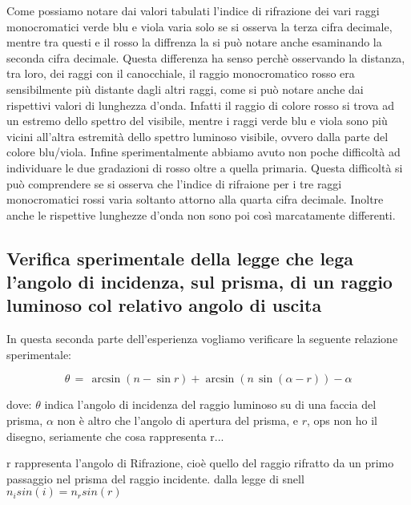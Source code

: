 Come possiamo notare dai valori tabulati l'indice di rifrazione dei vari raggi monocromatici verde blu e viola varia solo se si osserva la terza cifra decimale, mentre tra questi e il rosso la diffrenza la si può notare anche esaminando la seconda cifra decimale. Questa differenza ha senso perchè osservando la distanza, tra loro, dei raggi con il canocchiale, il raggio monocromatico rosso era sensibilmente più distante dagli altri raggi, come si può notare anche dai rispettivi valori di lunghezza d'onda. Infatti il raggio di colore rosso si trova ad un estremo dello spettro del visibile, mentre i raggi verde blu e viola sono più vicini all'altra estremità dello spettro luminoso visibile, ovvero dalla parte del colore blu/viola. Infine sperimentalmente abbiamo avuto non poche difficoltà ad individuare le due gradazioni di rosso oltre a quella primaria. Questa difficoltà si può comprendere se si osserva che l'indice di rifraione per i tre raggi monocromatici rossi varia soltanto attorno alla quarta cifra decimale. Inoltre anche le rispettive lunghezze d'onda non sono poi così marcatamente differenti.

\subsection{Verifica sperimentale della legge che lega l'angolo di incidenza, sul prisma, di un raggio luminoso col relativo angolo di uscita}

In questa seconda parte dell'esperienza vogliamo verificare la seguente relazione sperimentale:

\begin{equation}
	\theta \,=\, \arcsin{(n - \sin{r})} + \arcsin{(n \, \sin{(\alpha - r)})} - \alpha
	\label{eq.brutta}
\end{equation}

dove: $\theta$ indica l'angolo di incidenza del raggio luminoso su di una faccia del prisma, $\alpha$ non è altro che l'angolo di apertura del prisma, e $r$, ops non ho il disegno, seriamente che cosa rappresenta r...

r rappresenta l'angolo di Rifrazione, cioè quello del raggio rifratto da un primo passaggio nel prisma del raggio incidente. dalla legge di snell $n_isin(i) = n_rsin(r)$



